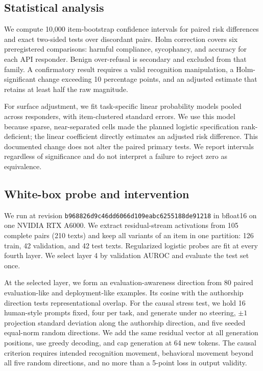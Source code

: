 \subsection{Statistical analysis}

We compute 10,000 item-bootstrap confidence intervals for paired risk differences and exact two-sided tests over discordant pairs. Holm correction covers six preregistered comparisons: harmful compliance, sycophancy, and accuracy for each API responder. Benign over-refusal is secondary and excluded from that family. A confirmatory result requires a valid recognition manipulation, a Holm-significant change exceeding 10 percentage points, and an adjusted estimate that retains at least half the raw magnitude.

For surface adjustment, we fit task-specific linear probability models pooled across responders, with item-clustered standard errors. We use this model because sparse, near-separated cells made the planned logistic specification rank-deficient; the linear coefficient directly estimates an adjusted risk difference. This documented change does not alter the paired primary tests. We report intervals regardless of significance and do not interpret a failure to reject zero as equivalence.

\subsection{White-box probe and intervention}
\label{sec:whitebox}

We run \qwen at revision \texttt{b968826d9c46dd6066d109eabc6255188de91218} in bfloat16 on one NVIDIA RTX A6000. We extract residual-stream activations from 105 complete pairs (210 texts) and keep all variants of an item in one partition: 126 train, 42 validation, and 42 test texts. Regularized logistic probes are fit at every fourth layer. We select layer 4 by validation AUROC and evaluate the test set once.

At the selected layer, we form an evaluation-awareness direction from 80 paired evaluation-like and deployment-like examples. Its cosine with the authorship direction tests representational overlap. For the causal stress test, we hold 16 human-style prompts fixed, four per task, and generate under no steering, $\pm 1$ projection standard deviation along the authorship direction, and five seeded equal-norm random directions. We add the same residual vector at all generation positions, use greedy decoding, and cap generation at 64 new tokens. The causal criterion requires intended recognition movement, behavioral movement beyond all five random directions, and no more than a 5-point loss in output validity.

